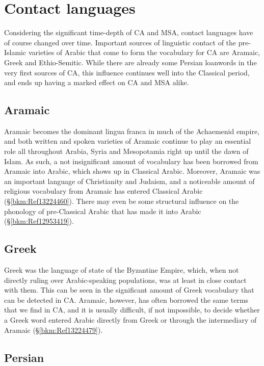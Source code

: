 \documentclass[output=paper]{langsci/langscibook}
\begin{document}
\section{Contact languages}


Considering the significant time-depth of CA and MSA, contact languages have of course changed over time. Important sources of linguistic contact of the pre-Islamic varieties of Arabic that come to form the vocabulary for CA are Aramaic, Greek and Ethio-Semitic. While there are already some Persian loanwords in the very first sources of CA, this influence continues well into the Classical period, and ends up having a marked effect on CA and MSA alike.

\subsection{Aramaic}
Aramaic becomes the dominant lingua franca in much of the Achaemenid empire, and both written and spoken varieties of Aramaic continue to play an essential role all throughout Arabia, Syria and Mesopotamia right up until the dawn of Islam. As such, a not insignificant amount of vocabulary has been borrowed from Aramaic into Arabic, which shows up in Classical Arabic. Moreover, Aramaic was an important language of Christianity and Judaism, and a noticeable amount of religious vocabulary from Aramaic has entered Classical Arabic (§\ref{bkm:Ref13224460}). There may even be some structural influence on the phonology of pre-Classical Arabic that has made it into Arabic (§\ref{bkm:Ref12953419}).

\subsection{Greek}

Greek was the language of state of the Byzantine Empire, which, when not directly ruling over Arabic-speaking populations, was at least in close contact with them. This can be seen in the significant amount of Greek vocabulary that can be detected in CA. Aramaic, however, has often borrowed the same terms that we find in CA, and it is usually difficult, if not impossible, to decide whether a Greek word entered Arabic directly from Greek or through the intermediary of Aramaic (§\ref{bkm:Ref13224479}).

\subsection{Persian}
\end{document}
